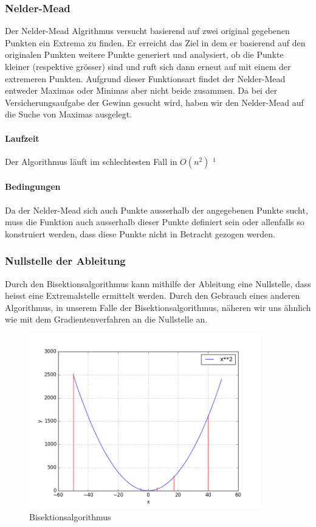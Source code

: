 \documentclass[10pt]{article}         %
\begin{document}
\subsubsection{Nelder-Mead}
Der Nelder-Mead Algrithmus versucht basierend auf zwei original gegebenen Punkten ein Extrema zu finden. Er erreicht das Ziel in dem er basierend auf den originalen Punkten weitere Punkte generiert und analysiert, ob die Punkte kleiner (respektive grösser) sind und ruft sich dann erneut auf mit einem der extremeren Punkten. Aufgrund dieser Funktionsart findet der Nelder-Mead entweder Maximas oder Minimas aber nicht beide zusammen. Da bei der Versicherungsaufgabe der Gewinn gesucht wird, haben wir den Nelder-Mead auf die Suche von Maximas ausgelegt.

\paragraph{Laufzeit}
Der Algorithmus läuft im schlechtesten Fall in $O(n^2)$ $^1$

\paragraph{Bedingungen}
Da der Nelder-Mead sich auch Punkte ausserhalb der angegebenen Punkte sucht, muss die Funktion auch ausserhalb dieser Punkte definiert sein oder allenfalls so konstruiert werden, dass diese Punkte nicht in Betracht gezogen werden.

\subsubsection{Nullstelle der Ableitung}
Durch den Bisektionsalgorithmus kann mithilfe der Ableitung eine Nullstelle, dass heisst eine Extremalstelle ermittelt werden. Durch den Gebrauch eines anderen Algorithmus, in unserem Falle der Bisektionsalgorithmus, näheren wir uns ähnlich wie mit dem Gradientenverfahren an die Nullstelle an. 

\begin{figure}[!ht]
    \centering
    \includegraphics[width=0.9\textwidth]{bisektion}
    \caption{Bisektionsalgorithmus}\label{bisektion}
\end{figure}
\end{document}
